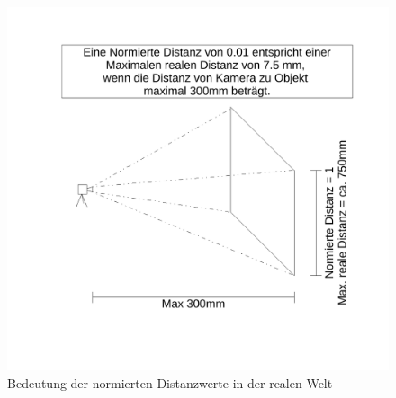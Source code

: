 \begin{figure}	
	\centering
	\includegraphics[width=.7\textwidth]{Kapitel/70Resultate/Bilder/DistanzenBerechnung.pdf}
	\caption{Bedeutung der normierten Distanzwerte in der realen Welt}
	\label{img:explain_normed_distance}
\end{figure}

